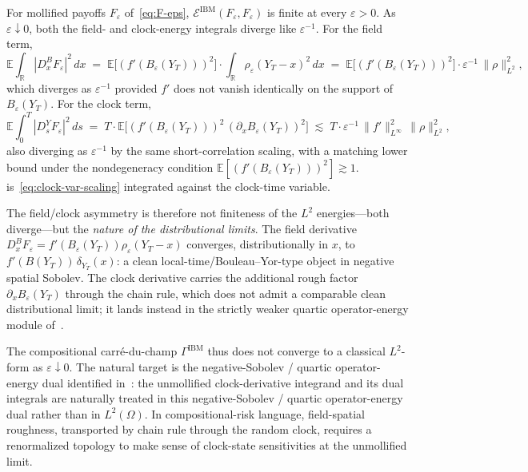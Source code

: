 \documentclass[11pt,reqno]{amsart}
\theoremstyle{plain}
\theoremstyle{definition}
\theoremstyle{remark}
\newcommand{\R}{\mathbb R}
\newcommand{\E}{\mathbb E}
\newcommand{\cE}{\mathcal E}
\newcommand{\Bvar}{B}
\newcommand{\Yclock}{Y}
\begin{document}
For mollified payoffs $F_{\varepsilon}$ of~\eqref{eq:F-eps},
$\cE^{\mathrm{IBM}}(F_{\varepsilon},F_{\varepsilon})$ is finite
at every $\varepsilon>0$. As $\varepsilon\downarrow 0$, both
the field- and clock-energy integrals diverge like
$\varepsilon^{-1}$. For the field term,
\begin{equation}\label{eq:field-energy-blowup}
  \E\!\int_{\R}|D^{\Bvar}_{x}F_{\varepsilon}|^{2}\,dx
   \;=\;\E\bigl[(f'(\Bvar_{\varepsilon}(\Yclock_{T})))^{2}\bigr]
        \cdot\int_{\R}\rho_{\varepsilon}(\Yclock_{T}-x)^{2}\,dx
   \;=\;\E\bigl[(f'(\Bvar_{\varepsilon}(\Yclock_{T})))^{2}\bigr]
        \cdot\varepsilon^{-1}\,\|\rho\|_{L^{2}}^{2},
\end{equation}
which diverges as $\varepsilon^{-1}$ provided $f'$ does not
vanish identically on the support of
$\Bvar_{\varepsilon}(\Yclock_{T})$. For the clock term,
\begin{equation}\label{eq:clock-energy-blowup}
  \E\!\int_{0}^{T}|D^{\Yclock}_{s}F_{\varepsilon}|^{2}\,ds
   \;=\;T\cdot\E\bigl[(f'(\Bvar_{\varepsilon}(\Yclock_{T})))^{2}\,(\partial_{x}\Bvar_{\varepsilon}(\Yclock_{T}))^{2}\bigr]
   \;\lesssim\;T\cdot\varepsilon^{-1}\,\|f'\|_{L^{\infty}}^{2}\,\|\rho\|_{L^{2}}^{2},
\end{equation}
also diverging as $\varepsilon^{-1}$ by the same
short-correlation scaling, with a matching lower bound under the
nondegeneracy condition $\E[(f'(\Bvar_{\varepsilon}(\Yclock_{T})))^{2}]
\gtrsim 1$. 
is~\eqref{eq:clock-var-scaling} integrated against the clock-time
variable.

The field/clock asymmetry is therefore not finiteness of the
$L^{2}$ energies---both diverge---but the \emph{nature of the
distributional limits}. The field derivative
$D^{\Bvar}_{x}F_{\varepsilon}=f'(\Bvar_{\varepsilon}(\Yclock_{T}))\rho_{\varepsilon}(\Yclock_{T}-x)$
converges, distributionally in $x$, to $f'(\Bvar(\Yclock_{T}))\,\delta_{\Yclock_{T}}(x)$:
a clean local-time/Bouleau--Yor-type object in negative spatial
Sobolev. The clock derivative carries the additional rough
factor $\partial_{x}\Bvar_{\varepsilon}(\Yclock_{T})$ through
the chain rule, which does not admit a comparable clean
distributional limit; it lands instead in the strictly weaker
quartic operator-energy module
of~\cite{EnergyFirst,FCDC,BidegreeAtlas}.

The compositional carr\'e-du-champ $\Gamma^{\mathrm{IBM}}$ thus
does not converge to a classical $L^{2}$-form as
$\varepsilon\downarrow 0$. The natural target is the
negative-Sobolev / quartic operator-energy dual identified
in~\cite{EnergyFirst,FCDC,BidegreeAtlas}: the unmollified
clock-derivative integrand and its dual integrals are naturally
treated in this negative-Sobolev / quartic operator-energy dual
rather than in $L^{2}(\Omega)$. In compositional-risk language, field-spatial
roughness, transported by chain rule through the random clock,
requires a renormalized topology to make sense of clock-state
sensitivities at the unmollified limit.
\end{document}

